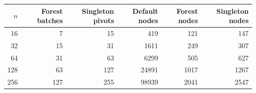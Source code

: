 \begingroup
\small\setlength{\tabcolsep}{4pt}
\begin{tabular}{rrrrrr}
\toprule
$n$ & Forest batches & Singleton pivots & Default nodes & Forest nodes & Singleton nodes \\
\midrule
16 & 7 & 15 & 419 & 121 & 147 \\
32 & 15 & 31 & 1611 & 249 & 307 \\
64 & 31 & 63 & 6299 & 505 & 627 \\
128 & 63 & 127 & 24891 & 1017 & 1267 \\
256 & 127 & 255 & 98939 & 2041 & 2547 \\
\bottomrule
\end{tabular}
\endgroup
